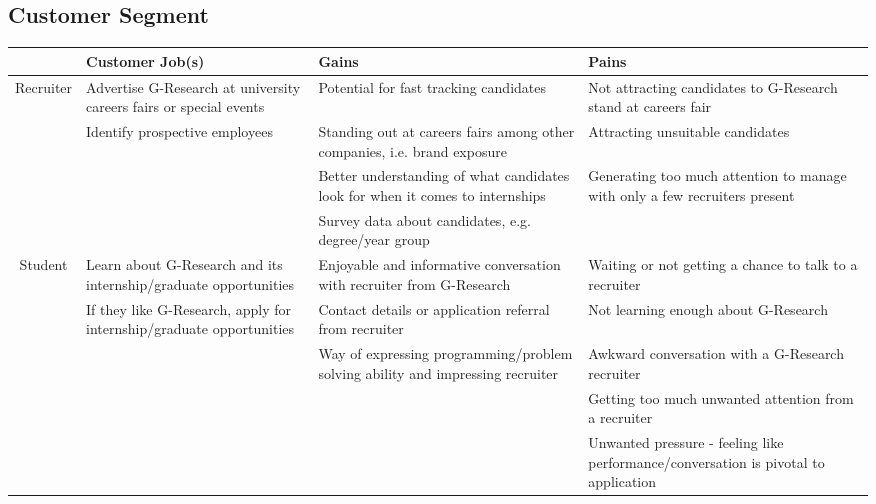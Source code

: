 \subsection{Customer Segment}
\begin{tabularx}{\textwidth}{| c | X | X | X |}
	\hline
	& Customer Job(s) & Gains & Pains \\ 
	\hline\hline
	\multirow{4}{*}{Recruiter} & Advertise G-Research at  university careers fairs or special events
		       & Potential for fast tracking candidates 
		       & Not attracting candidates to G-Research stand at careers fair \\ \cline{2-4}

		       & Identify prospective employees
		       & Standing out at careers fairs among other companies, i.e. brand exposure
		       & Attracting unsuitable candidates \\ \cline{2-4}
	
		       & 
		       & Better understanding of what candidates look for when it comes to internships
		       & Generating too much attention to manage with only a few recruiters present \\ \cline{3-3}

		       & 
		       & Survey data about candidates, e.g. degree/year group
		       & \\ 
	
	\hline\hline
	\multirow{4}{*}{Student} & Learn about G-Research and its internship/graduate opportunities
		       & Enjoyable and informative conversation with recruiter from G-Research
		       & Waiting or not getting a chance to talk to a recruiter \\ \cline{2-4}

		       & If they like G-Research, apply for internship/graduate opportunities
		       & Contact details or application referral from recruiter
		       & Not learning enough about G-Research \\ \cline{2-4}

			&
			& Way of expressing programming/problem solving ability and impressing recruiter
			& Awkward conversation with a G-Research recruiter \\ \cline{3-4}
	
			&
			& 
			& Getting too much unwanted attention from a recruiter \\ \cline{4-4}

			&
			& 
			&  Unwanted pressure - feeling like performance/conversation is pivotal to application\\
	\hline
\end{tabularx}


